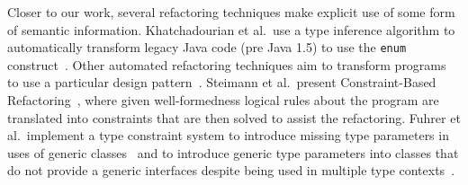 \documentclass[conference]{IEEEtran}
\begin{document}
Closer to our work, several refactoring techniques make explicit use of some
form of semantic information.
%
%
Khatchadourian et al.~use a type inference algorithm to automatically
transform legacy Java code (pre Java 1.5) to use the \lstinline[breaklines=true]{enum}
construct~\cite{sawin}.
%
%
Other automated refactoring techniques aim to transform programs to use a
particular design pattern~\cite{chris,bae}.
%
%
%
%
%
Steimann et al.~present Constraint-Based
Refactoring~\cite{Steimann2011,Steimann2012Pilgrim,Steimann2011KollePilgrim},
where given well-formedness logical rules about the program are translated
into constraints that are then solved to assist the refactoring.
%
%
Fuhrer et al.~implement a type constraint system to introduce missing type
parameters in uses of generic classes~\cite{DBLP:conf/ecoop/FuhrerTKDK05}
and to introduce generic type parameters into classes that do not provide a
generic interfaces despite being used in multiple type
contexts~\cite{DBLP:conf/icse/KiezunETF07}.
%
%
\end{document}
